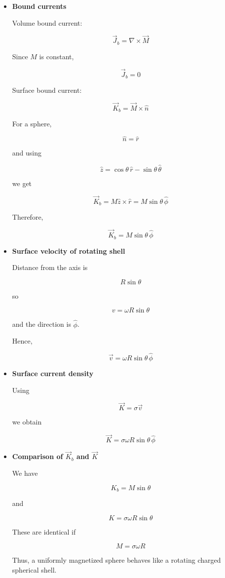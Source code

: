 \documentclass[12pt]{article}
\begin{document}
\begin{enumerate}
\begin{itemize}
\item[(a)] \textbf{Bound currents}

Volume bound current:

\[
\vec J_b=\nabla\times\vec M
\]

Since \(M\) is constant,

\[
\boxed{
\vec J_b=0
}
\]

Surface bound current:

\[
\vec K_b=\vec M\times\hat n
\]

For a sphere,

\[
\hat n=\hat r
\]

and using

\[
\hat z=\cos\theta\,\hat r-\sin\theta\,\hat\theta
\]

we get

\[
\vec K_b
=
M\hat z\times\hat r
=
M\sin\theta\,\hat\phi
\]

Therefore,

\[
\boxed{
\vec K_b=M\sin\theta\,\hat\phi
}
\]

\item[(b)] \textbf{Surface velocity of rotating shell}

Distance from the axis is

\[
R\sin\theta
\]

so

\[
v=\omega R\sin\theta
\]

and the direction is \(\hat\phi\).

Hence,

\[
\boxed{
\vec v=\omega R\sin\theta\,\hat\phi
}
\]

\item[(c)] \textbf{Surface current density}

Using

\[
\vec K=\sigma\vec v
\]

we obtain

\[
\boxed{
\vec K
=
\sigma\omega R\sin\theta\,\hat\phi
}
\]

\item[(d)] \textbf{Comparison of \(\vec K_b\) and \(\vec K\)}

We have

\[
K_b=M\sin\theta
\]

and

\[
K=\sigma\omega R\sin\theta
\]

These are identical if

\[
\boxed{
M=\sigma\omega R
}
\]

Thus, a uniformly magnetized sphere behaves like a rotating charged spherical shell.


\end{itemize}
\end{enumerate}
\end{document}
